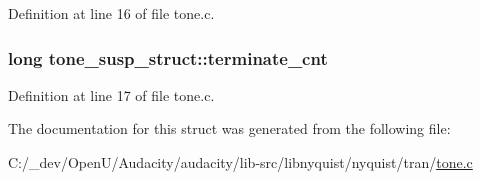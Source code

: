 Definition at line 16 of file tone.\+c.

\subsubsection[{\texorpdfstring{terminate\+\_\+cnt}{terminate_cnt}}]{\setlength{\rightskip}{0pt plus 5cm}long tone\+\_\+susp\+\_\+struct\+::terminate\+\_\+cnt}\hypertarget{structtone__susp__struct_a190064881536c16a25675f2f42bcbd92}{}\label{structtone__susp__struct_a190064881536c16a25675f2f42bcbd92}


Definition at line 17 of file tone.\+c.



The documentation for this struct was generated from the following file\+:\begin{DoxyCompactItemize}
\item 
C\+:/\+\_\+dev/\+Open\+U/\+Audacity/audacity/lib-\/src/libnyquist/nyquist/tran/\hyperlink{libnyquist_2nyquist_2tran_2tone_8c}{tone.\+c}\end{DoxyCompactItemize}
